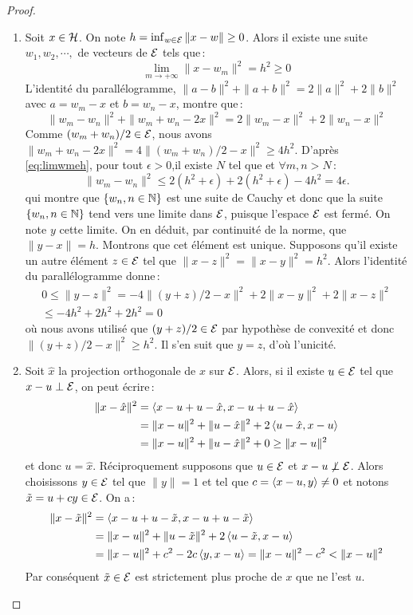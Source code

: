 \begin{proof}\smartqed
\begin{enumerate}[label=\emph{\alph*})]
   \item
Soit $x\in\mathcal{H}$. On note $h=\inf_{w \in \mathcal{E}} \| x - w \| \geq 0$.
Alors il existe une suite $w_1, w_2, \cdots, $ de vecteurs de
$\mathcal{E}$ tels que\,:
\begin{equation}
 \label{eq:limwmeh}
  \lim_{m\rightarrow +\infty} \| x - w_m \|^2 =h^2 \geq 0
\end{equation}
L'identit\'{e} du parall\'{e}logramme,
$\|a-b\|^2+\|a+b\|^2=2\|a\|^2+2\|b\|^2$ avec $a=w_m-x$ et
$b=w_n-x$, montre que\,:
\[
  \| w_m - w_n \|^2 + \| w_m + w_n -2x\|^2
    = 2 \| w_m - x \|^2 + 2 \| w_n - x \|^2
\]
Comme $(w_m+w_n)/2 \in \mathcal{E}$, nous avons $ \| w_m + w_n -2x \|^2 =
4 \| (w_m+w_n)/2 - x \|^2 \geq 4 h^2$. D'apr\`{e}s
\ref{eq:limwmeh}, pour tout $\epsilon> 0$,il existe $N$ tel que et
$\forall m,n>N$\,:
\[
  \| w_m - w_n \|^2 \leq 2 (h^2+\epsilon) + 2(h^2+\epsilon) - 4h^2
  = 4 \epsilon.
\]
qui montre que $\{w_n, n \in \mathbb{N}\}$ est une suite de Cauchy et donc que la suite $\{w_n, n \in \mathbb{N}\}$
tend vers une limite dans $\mathcal{E}$, puisque l'espace $\mathcal{E}$ est ferm\'{e}.
On note $y$ cette limite. On en d\'{e}duit, par continuit\'{e} de la
norme, que $\| y - x \| = h$. Montrons que cet \'{e}l\'{e}ment est unique.
Supposons qu'il existe un autre \'{e}l\'{e}ment $z\in\mathcal{E}$ tel que
$\|x-z\|^2=\|x-y\|^2=h^2$. Alors l'identit\'{e} du parall\'{e}logramme
donne\,:
\begin{multline*}
 0\leq \|y-z\|^2=-4\|(y+z)/2-x\|^2+2\|x-y\|^2+2\|x-z\|^2
 \\\leq -4h^2+2h^2+2h^2=0
\end{multline*}
o\`{u} nous avons utilis\'{e} que $(y+z)/2\in\mathcal{E}$ par hypoth\`{e}se de convexit\'{e} et donc
$\|(y+z)/2-x\|^2\geq h^2$. Il s'en suit que $y=z$, d'o\`{u} l'unicit\'{e}.
   \item
 Soit $\hat x$ la projection orthogonale de $x$ sur $\mathcal{E}$.
Alors, si il existe $u\in\mathcal{E}$ tel que $x-u\perp \mathcal{E}$, on peut
\'{e}crire\,:
\begin{align*}
 \|x-\hat x\|^2
 &=\left\langle x-u+u-\hat x, x-u+u-\hat x \right\rangle\\
 &=\|x-u\|^2+\|u-\hat x\|^2+2\left\langle u-\hat x, x-u \right\rangle \\
 &=\|x-u\|^2+\|u-\hat x\|^2+0 \geq \|x-u\|^2
\end{align*}
et donc $u=\hat x$.
R\'{e}ciproquement supposons que $u\in\mathcal{E}$ et $x-u\not \perp \mathcal{E}$.
Alors choisissons $y\in\mathcal{E}$ tel que $\|y\|=1$ et tel que
$c=\left\langle x-u, y \right\rangle\neq 0$ et notons $\tilde x=u + cy\in\mathcal{E}$. On a\,:
\begin{align*}
\|x-\tilde x\|^2
&=\left\langle x-u+u-\tilde x, x-u+u-\tilde x \right\rangle \\
&=\|x-u\|^2+\|u-\tilde x\|^2 +2\left\langle u-\tilde x, x-u \right\rangle \\
& =\|x-u\|^2+c^2 -2c \left\langle y, x-u \right\rangle=\|x-u\|^2-c^2<\|x-u\|^2
\end{align*}
Par cons\'{e}quent $\tilde x\in\mathcal{E}$ est strictement plus proche de $x$
que ne l'est $u$.
 \end{enumerate}

\end{proof}
